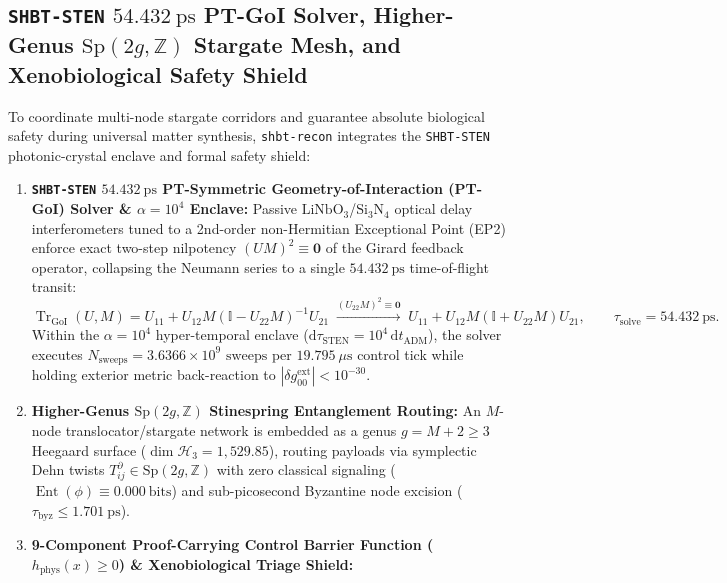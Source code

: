 \documentclass[11pt,onecolumn]{article}
\begin{document}
\FloatBarrier
\subsection[\texttt{SHBT-STEN} PT-GoI Solver, \texorpdfstring{$\mathrm{Sp}(2g, \mathbb{Z})$}{Sp(2g, Z)} Stargate Mesh, and Xenobiological Shield]{\texttt{SHBT-STEN} \texorpdfstring{$54.432~\mathrm{ps}$}{54.432 ps} PT-GoI Solver, Higher-Genus \texorpdfstring{$\mathrm{Sp}(2g, \mathbb{Z})$}{Sp(2g, Z)} Stargate Mesh, and Xenobiological Safety Shield}
\label{subsec:sten_shield}
To coordinate multi-node stargate corridors and guarantee absolute biological safety during universal matter synthesis, \texttt{shbt-recon} integrates the \texttt{SHBT-STEN} photonic-crystal enclave and formal safety shield:
\begin{enumerate}
    \item \textbf{\texttt{SHBT-STEN} $54.432~\mathrm{ps}$ PT-Symmetric Geometry-of-Interaction (PT-GoI) Solver \& $\alpha = 10^4$ Enclave:}
    Passive $\text{LiNbO}_3$/$\text{Si}_3\text{N}_4$ optical delay interferometers tuned to a 2nd-order non-Hermitian Exceptional Point (EP2) enforce exact two-step nilpotency $(UM)^2 \equiv \mathbf{0}$ of the Girard feedback operator, collapsing the Neumann series to a single $54.432~\text{ps}$ time-of-flight transit:
    \begin{equation}
    \operatorname{Tr}_{\text{GoI}}(U, M) = U_{11} + U_{12} M (\mathbb{I} - U_{22} M)^{-1} U_{21} \;\xrightarrow{(U_{22}M)^2 \equiv \mathbf{0}}\; U_{11} + U_{12} M (\mathbb{I} + U_{22} M) U_{21}, \qquad \tau_{\text{solve}} = 54.432~\text{ps}.
    \label{eq:sten_pt_goi}
    \end{equation}
    Within the $\alpha = 10^4$ hyper-temporal enclave ($\mathrm{d}\tau_{\text{STEN}} = 10^4\,\mathrm{d}t_{\text{ADM}}$), the solver executes $N_{\text{sweeps}} = 3.6366\times 10^9\text{ sweeps}$ per $19.795~\mu\text{s}$ control tick while holding exterior metric back-reaction to $|\delta g_{00}^{\text{ext}}| < 10^{-30}$.
    \item \textbf{Higher-Genus $\mathrm{Sp}(2g, \mathbb{Z})$ Stinespring Entanglement Routing:}
    An $M$-node translocator/stargate network is embedded as a genus $g = M + 2 \ge 3$ Heegaard surface ($\dim\mathcal{H}_3 = 1{,}529.85$), routing payloads via symplectic Dehn twists $T_{ij}^\partial \in \mathrm{Sp}(2g, \mathbb{Z})$ with zero classical signaling ($\operatorname{Ent}(\phi) \equiv 0.000~\text{bits}$) and sub-picosecond Byzantine node excision ($\tau_{\text{byz}} \le 1.701~\text{ps}$).
    \item \textbf{9-Component Proof-Carrying Control Barrier Function ($h_{\text{phys}}(x) \ge 0$) \& Xenobiological Triage Shield:}

\end{enumerate}
\end{document}
